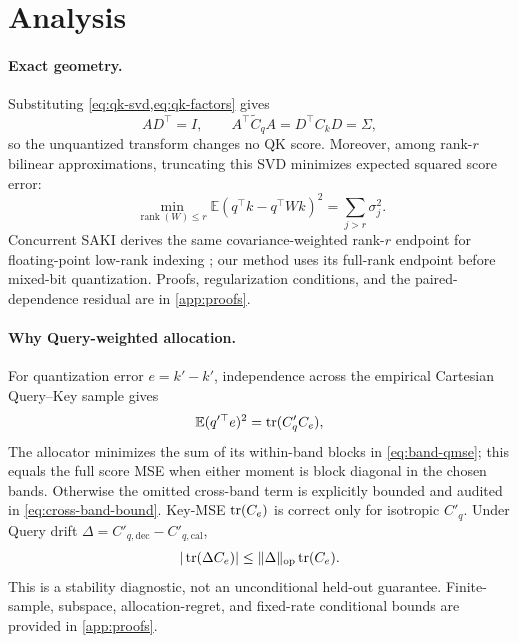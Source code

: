 \section{Analysis}
\label{sec:analysis}

\paragraph{Exact geometry.}
Substituting \cref{eq:qk-svd,eq:qk-factors} gives
\begin{equation}
 AD^\top=I,\qquad
 A^\top\widetilde C_qA=D^\top C_kD=\Sigma,
 \label{eq:main-exact-balance}
\end{equation}
so the unquantized transform changes no QK score.  Moreover, among rank-$r$
bilinear approximations, truncating this SVD minimizes expected squared score
error:
\begin{equation}
 \min_{\operatorname{rank}(W)\le r}
 \mathbb E(q^\top k-q^\top Wk)^2=\sum_{j>r}\sigma_j^2.
 \label{eq:main-rank-optimal}
\end{equation}
Concurrent SAKI derives the same covariance-weighted rank-$r$ endpoint for
floating-point low-rank indexing \citep{zhang2026saki}; our method uses its
full-rank endpoint before mixed-bit quantization.  Proofs, regularization
conditions, and the paired-dependence residual are in \cref{app:proofs}.

\paragraph{Why Query-weighted allocation.}
For quantization error $e=k'-\widehat k'$, independence across the empirical
Cartesian Query--Key sample gives
\begin{equation}
 \mathbb E(q'^\top e)^2=\operatorname{tr}(C'_qC_e),
 \label{eq:main-qmse}
\end{equation}
The allocator minimizes the sum of its within-band blocks in
\cref{eq:band-qmse}; this equals the full score MSE when either moment is
block diagonal in the chosen bands.  Otherwise the omitted cross-band term is
explicitly bounded and audited in \cref{eq:cross-band-bound}.  Key-MSE
$\operatorname{tr}(C_e)$ is correct only for isotropic $C'_q$.  Under Query drift
$\Delta=C'_{q,\mathrm{dec}}-C'_{q,\mathrm{cal}}$,
\begin{equation}
 |\operatorname{tr}(\Delta C_e)|\le\|\Delta\|_{\mathrm{op}}\operatorname{tr}(C_e).
 \label{eq:main-drift}
\end{equation}
This is a stability diagnostic, not an unconditional held-out guarantee.
Finite-sample, subspace, allocation-regret, and fixed-rate conditional bounds
are provided in \cref{app:proofs}.

